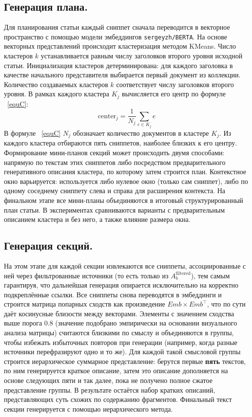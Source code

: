 \documentclass{article}
\theoremstyle{definition}
\theoremstyle{plain}
\begin{document}
\subsection*{Генерация плана.}
Для планирования статьи каждый сниппет сначала переводится в векторное пространство с помощью модели эмбеддингов \texttt{sergeyzh/BERTA}. 
На основе векторных представлений происходит кластеризация методом KMeans. Число кластеров \(k\) устанавливается равным числу заголовков второго уровня исходной статьи. 
Инициализация кластеров детерминирована: для каждого заголовка в качестве начального представителя выбирается первый документ из коллекции.
Количество создаваемых кластеров $k$ соответствует числу заголовков второго уровня. 
В рамках каждого кластера $K_j$ вычисляется его центр по формуле ~\eqref{equC}:
\begin{equation}\label{equC}
\text{center}_j = \frac{1}{N_j} \sum_{e \in K_j} e
\end{equation}
В формуле ~\eqref{equC} $N_j$ обозначает количество документов в кластере $K_j$.
Из каждого кластера отбираются пять сниппетов, наиболее близких к его центру.
Формирование мини-планов секций может происходить двумя способами: напрямую по текстам этих сниппетов либо посредством предварительного генеративного описания кластера, по которому затем строится план.
Контекстное окно варьируется: используется либо нулевое окно (только сам сниппет), либо по одному соседнему сниппету слева и справа для расширения контекста. 
На финальном этапе все мини-планы объединяются в итоговый структурированный план статьи. 
В экспериментах сравниваются варианты с предварительным описанием кластера и без него, а также влияние размера окна. 

\subsection*{Генерация секций.}
На этом этапе для каждой секции извлекаются все сниппеты, ассоциированные с ней через фильтрованные источники 
(то есть только из \(A_b^{\mathrm{filtered}}\)), тем самым гарантируя, что дальнейшая генерация опирается исключительно на корректно подкреплённые ссылки. 
Все сниппеты снова переводятся в эмбеддинги и строится матрица попарных сходств как произведение \(Emb \times Emb^\top\), что по сути даёт косинусные близости между векторами. 
Элементы с значением сходства выше порога 0.8 (значение подобрано эмпирически на основании визуального анализа матрицы) считаются близкими по смыслу и объединяются в группы, 
чтобы избежать избыточных повторов при генерации (например, когда разные источники перефразируют одно и то же). 
Для каждой такой смысловой группы строится иерархическое суммарное представление: 
берутся первые \textbf{пять} текстов, по ним генерируется краткое описание, затем это описание дополняется на основе следующих пяти и так далее, пока не получено полное сжатое представление группы. 
В результате остаётся набор кратких описаний, представляющих суть схожих по содержанию фрагментов. 
Финальный текст секции генерируется с помощью иерархического метода.
\end{document}
